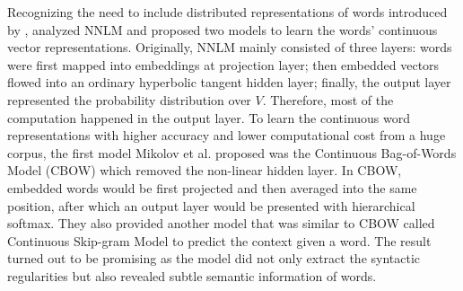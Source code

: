 \documentclass[12pt]{diazessay} %
\begin{document}
{Recognizing the need to include distributed representations of words introduced by \citet{hinton1984distributed}, \citet{mikolov2013efficient} analyzed NNLM and proposed two models to learn the words' continuous vector representations. Originally, NNLM mainly consisted of three layers: words were first mapped into embeddings at projection layer; then embedded vectors flowed into an ordinary hyperbolic tangent hidden layer; finally, the output layer represented the probability distribution over $V$. Therefore, most of the computation happened in the output layer. To learn the continuous word representations with higher accuracy and lower computational cost from a huge corpus, the first model Mikolov et al. proposed was the Continuous Bag-of-Words Model (CBOW) which removed the non-linear hidden layer. In CBOW, embedded words would be first projected and then averaged into the same position, after which an output layer would be presented with hierarchical softmax. They also provided another model that was similar to CBOW called Continuous Skip-gram Model to predict the context given a word. The result turned out to be promising as the model did not only extract the syntactic regularities but also revealed subtle semantic information of words.



}
\end{document}
